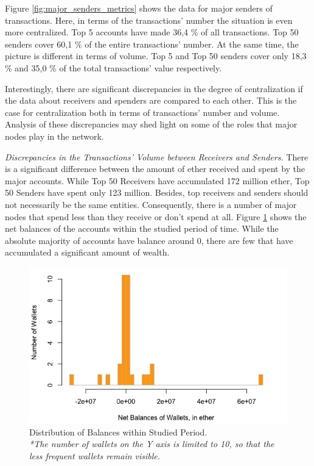 Figure \ref{fig:major_senders_metrics} shows the data for major senders of transactions.
Here, in terms of the transactions' number the situation is even more centralized.
Top 5 accounts have made 36,4 \% of all transactions.
Top 50 senders cover 60,1 \% of the entire transactions' number.
At the same time, the picture is different in terms of volume.
Top 5 and Top 50 senders cover only 18,3 \% and 35,0 \% of the total transactions' value respectively.

Interestingly, there are significant discrepancies in the degree of centralization if the data about receivers and spenders are compared to each other.
This is the case for centralization both in terms of transactions' number and volume.
Analysis of these discrepancies may shed light on some of the roles that major nodes play in the network.

\textit{Discrepancies in the Transactions' Volume between Receivers and Senders.} 
There is a significant difference between the amount of ether received and spent by the major accounts.
While Top 50 Receivers have accumulated 172 million ether, Top 50 Senders have spent only 123 million.
Besides, top receivers and senders should not necessarily be the same entities. 
Consequently, there is a number of major nodes that spend less than they receive or don't spend at all.
Figure \ref{fig:balances} shows the net balances of the accounts within the studied period of time. 
While the absolute majority of accounts have balance around 0, there are few that have accumulated a significant amount of wealth.

\begin{figure}[h!]
  \centering
  \includegraphics[width=1\linewidth]{figures/balances.jpeg}
  \caption{Distribution of Balances within Studied Period. \\ 
  \textit{*The number of wallets on the Y axis is limited to 10, so that the less frequent wallets remain visible.}}
  \label{fig:balances}
\end{figure}


